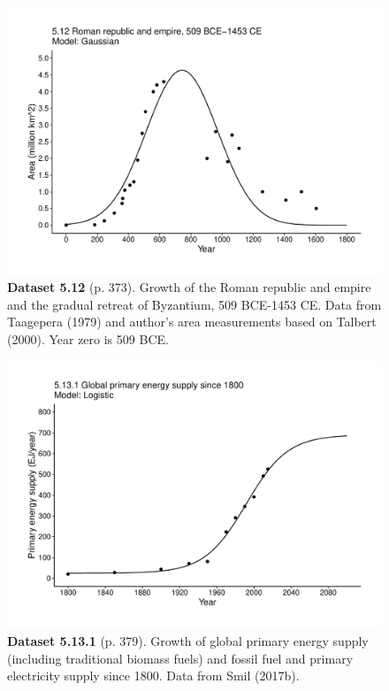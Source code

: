 \documentclass[aps,rmp,preprint,superscriptaddress,10pt,onecolumn]{article}
\begin{document}
\clearpage
\begin{figure}[h]
\includegraphics[width=\textwidth]{output/figs-ggplot/5.12.pdf}
\caption*{\textbf{Dataset 5.12} (p. 373). Growth of the Roman republic and empire and the gradual retreat of Byzantium, 509 BCE-1453 CE. Data from Taagepera (1979) and author's area measurements based on Talbert (2000). Year zero is 509 BCE. }
\end{figure}
	
\clearpage
\begin{figure}[h]
\includegraphics[width=\textwidth]{output/figs-ggplot/5.13.1.pdf}
\caption*{\textbf{Dataset 5.13.1} (p. 379). Growth of global primary energy supply (including traditional biomass fuels) and fossil fuel and primary electricity supply since 1800. Data from Smil (2017b). }
\end{figure}
	
\end{document}
